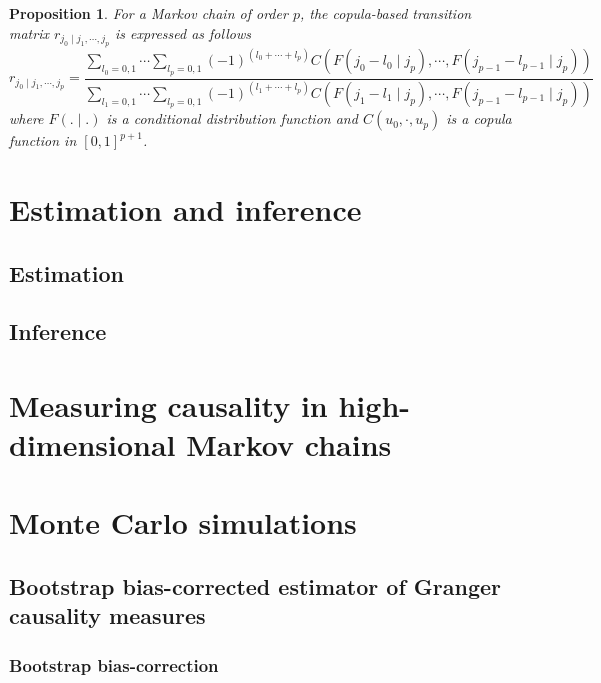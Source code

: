 \documentclass[harvard,11pt]{article}
\newtheorem{proposition}{Proposition}
\begin{document}
\begin{proposition}
For a Markov chain of order $p$, the copula-based transition matrix $r_{j_0\mid j_1,\cdots, j_p}$ is expressed as follows
\begin{equation}
r_{j_0\mid j_1,\cdots,j_p}=\frac{\sum\limits_{l_0=0,1}\cdots\sum\limits_{l_p=0,1}(-1)^{(l_0+\cdots+ l_p)}C(F(j_0-l_0\mid j_p),\cdots,F(j_{p-1}-l_{p-1}\mid j_p))}{\sum\limits_{l_1=0,1}\cdots\sum\limits_{l_p=0,1}(-1)^{(l_1+\cdots+l_p)}C(F(j_1-l_1\mid j_p),\cdots,F(j_{p-1}-l_{p-1}\mid j_p))}
\end{equation} 
where $F(.\mid .)$ is a conditional distribution function and $C(u_0,\cdot,u_p)$ is a copula function in $[0,1]^{p+1}$.
\end{proposition}


\section{Estimation and inference \label{Estimation and inference}}

\subsection{Estimation \label{Estimation}}

\subsection{Inference \label{Inference}}

\section{Measuring causality in high-dimensional Markov chains \label{Measuring causality in high-dimensional Markov chains}}
\section{Monte Carlo simulations \label{Monte Carlo simulations}}

\subsection{Bootstrap bias-corrected estimator of Granger causality measures \label{Bootstrap bias-corrected estimator of Granger causality measures}}

\subsubsection{Bootstrap bias-correction \label{Bootstrap bias-correction}}
\end{document}
